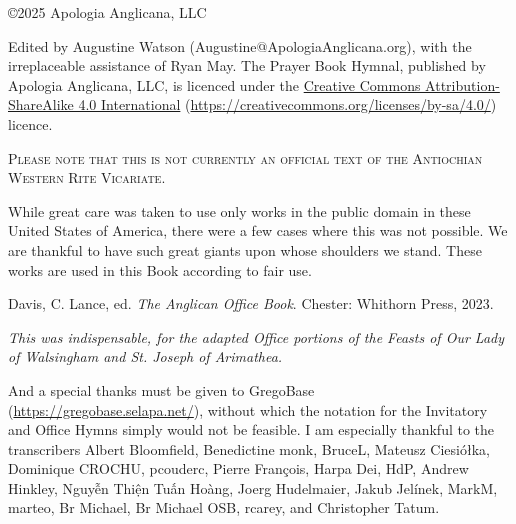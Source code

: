 \frontmatter
\setcounter{page}{1}
{}

\noindent
\copyright 2025 Apologia Anglicana, LLC\par\noindent
Edited by Augustine Watson (Augustine@ApologiaAnglicana.org), with the irreplaceable assistance of Ryan May.
The Prayer Book Hymnal, published by Apologia Anglicana, LLC, is licenced under the \href{https://creativecommons.org/licenses/by-sa/4.0/}{Creative Commons Attribution-ShareAlike 4.0 International} (\url{https://creativecommons.org/licenses/by-sa/4.0/}) licence.

\begin{center}
	\textsc{Please note that this is not currently an official text of the Antiochian Western Rite Vicariate.}
\end{center}

While great care was taken to use only works in the public domain in these United States of America, there were a few cases where this was not possible. We are thankful to have such great giants upon whose shoulders we stand. These works are used in this Book according to fair use.\par
Davis, C. Lance, ed. \textit{The Anglican Office Book}. Chester: Whithorn Press, 2023.\par\noindent
\textit{This was indispensable, for the adapted Office portions of the Feasts of Our Lady of Walsingham and St. Joseph of Arimathea.}\par


And a special thanks must be given to GregoBase (\url{https://gregobase.selapa.net/}), without which the notation for the Invitatory and Office Hymns simply would not be feasible. I am especially thankful to the transcribers Albert Bloomfield, Benedictine monk, BruceL, Mateusz Ciesiółka, Dominique CROCHU, pcouderc, Pierre François, Harpa Dei, HdP, Andrew Hinkley, Nguyễn Thiện Tuấn Hoàng, Joerg Hudelmaier, Jakub Jelínek, MarkM, marteo, Br Michael, Br Michael OSB, rcarey, and Christopher Tatum.
\clearpage
\footnotesize

